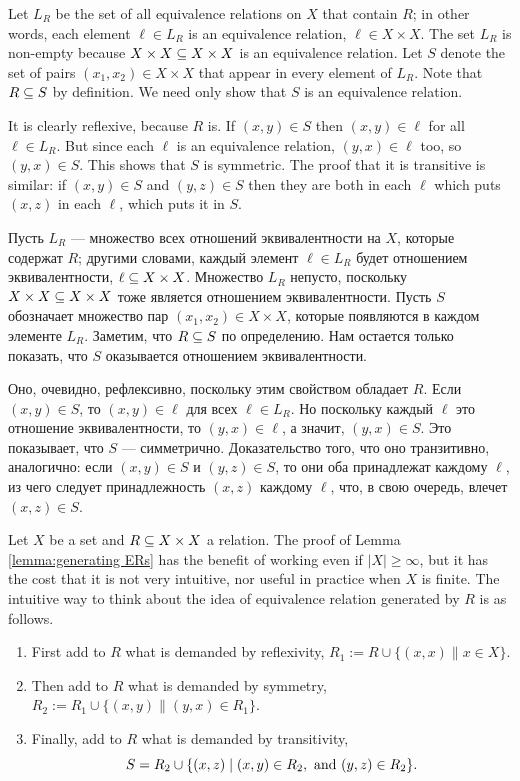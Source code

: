\documentclass[CT4S-EN-RU]{subfiles}
\begin{document}
\begin{proofENG}
Let $L_R$ be the set of all equivalence relations on $X$ that contain $R$; in other words, each element $\ell\in L_R$ is an equivalence relation, $\ell\in X\times X$. The set $L_R$ is non-empty because $X\times X\ss X\times X$ is an equivalence relation. Let $S$ denote the set of pairs $(x_1,x_2)\in X\times X$ that appear in every element of $L_R$. Note that $R\ss S$ by definition. We need only show that $S$ is an equivalence relation.

It is clearly reflexive, because $R$ is. If $(x,y)\in S$ then $(x,y)\in\ell$ for all $\ell\in L_R$. But since each $\ell$ is an equivalence relation, $(y,x)\in\ell$ too, so $(y,x)\in S$. This shows that $S$ is symmetric. The proof that it is transitive is similar: if $(x,y)\in S$ and $(y,z)\in S$ then they are both in each $\ell$ which puts $(x,z)$ in each $\ell$, which puts it in $S$.
\end{proofENG}

\begin{proofRUS}
Пусть $L_R$ — множество всех отношений эквивалентности на $X$, которые содержат $R$; другими словами, каждый элемент $\ell\in L_R$ будет отношением эквивалентности, $\ell\ss X\times X$. Множество $L_R$ непусто, поскольку $X\times X\ss X\times X$ тоже является отношением эквивалентности. Пусть $S$ обозначает множество пар $(x_1,x_2)\in X\times X$, которые появляются в каждом элементе $L_R$. Заметим, что $R\ss S$ по определению. Нам остается только показать, что $S$ оказывается отношением эквивалентности.

Оно, очевидно, рефлексивно, поскольку этим свойством обладает $R$. Если $(x,y)\in S$, то $(x,y)\in\ell$ для всех $\ell\in L_R$. Но поскольку каждый $\ell$ это отношение эквивалентности, то $(y,x)\in\ell$, а значит, $(y,x)\in S$. Это показывает, что $S$ — симметрично. Доказательство того, что оно транзитивно, аналогично: если $(x,y)\in S$ и $(y,z)\in S$, то они оба принадлежат каждому $\ell$, из чего следует принадлежность $(x,z)$ каждому $\ell$, что, в свою очередь, влечет $(x,z)\in S$.
\end{proofRUS}

\begin{remarkENG}
Let $X$ be a set and $R\ss X\times X$ a relation. The proof of Lemma \ref{lemma:generating ERs} has the benefit of working even if $|X|\geq\infty$, but it has the cost that it is not very intuitive, nor useful in practice when $X$ is finite. The intuitive way to think about the idea of equivalence relation generated by $R$ is as follows.
\begin{enumerate}
\item First add to $R$ what is demanded by reflexivity, $R_1:=R\cup\{(x,x)\|x\in X\}$.
\item Then add to $R$ what is demanded by symmetry, $R_2:=R_1\cup\{(x,y)\|(y,x)\in R_1\}.$
\item Finally, add to $R$ what is demanded by transitivity, $$S=R_2\cup\{(x,z)\|(x,y)\in R_2, \tn{ and } (y,z)\in R_2\}.$$
\end{enumerate}
\end{remarkENG}
\end{document}
